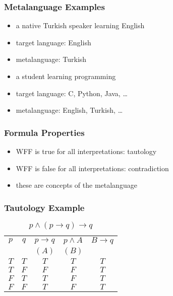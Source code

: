 \documentclass[dvipsnames]{beamer}
\begin{document}
\begin{frame}
  \frametitle{Metalanguage Examples}

  \begin{itemize}
    \item a native Turkish speaker learning English
    \item target language: English
    \item metalanguage: Turkish
  \end{itemize}

  \pause
  \begin{itemize}
    \item a student learning programming
    \item target language: C, Python, Java, \ldots
    \item metalanguage: English, Turkish, \ldots
  \end{itemize}
\end{frame}

\begin{frame}
  \frametitle{Formula Properties}

  \begin{itemize}
    \item WFF is true for all interpretations: \alert{tautology}
    \item WFF is false for all interpretations: \alert{contradiction}

    \pause
    \bigskip
    \item these are concepts of the metalanguage
  \end{itemize}
\end{frame}

\begin{frame}
  \frametitle{Tautology Example}

  \begin{table}
    \caption{$p \wedge (p \rightarrow q) \rightarrow q$}
    \begin{tabular}{|c|c|c|c||c|}\hline
      $p$ & $q$ & $p \rightarrow q$ & $p \wedge A$ & $B \rightarrow q$\\
          &     & $(A)$             & $(B)$        &\\\hline\hline
      $T$ & $T$ & $T$ & $T$ & $T$\\\hline
      $T$ & $F$ & $F$ & $F$ & $T$\\\hline
      $F$ & $T$ & $T$ & $F$ & $T$\\\hline
      $F$ & $F$ & $T$ & $F$ & $T$\\\hline
    \end{tabular}
  \end{table}
\end{frame}
\end{document}
